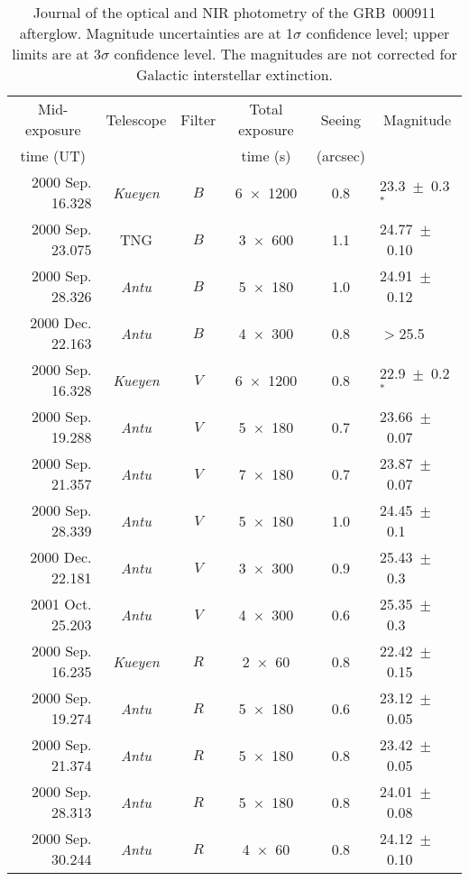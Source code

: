\begin{table}%
\caption{\label{tab1}Journal of the optical and NIR photometry of the GRB~000911 
afterglow. Magnitude uncertainties are at 1$\sigma$ confidence level; upper 
limits are at 3$\sigma$ confidence level. The magnitudes are not corrected 
for Galactic interstellar extinction.}
{
\begin{tabular}{rccccl}
\hline
\hline
\multicolumn{1}{c}{Mid-exposure} & Telescope & Filter & Total exposure &
Seeing & \multicolumn{1}{c}{Magnitude}\\
\multicolumn{1}{c}{time (UT)} & & & time (s) & (arcsec) &  \\
\hline
2000 Sep. 16.328 & {\it Kueyen} & $B$ & 6~$\times$~1200 & 0.8 &
23.3~$\pm$~0.3$^*$\\ 
2000 Sep. 23.075 & TNG          & $B$ &  3~$\times$~600 & 1.1 &
24.77~$\pm$~0.10\\ 
2000 Sep. 28.326 & {\it Antu}   & $B$ &  5~$\times$~180 & 1.0 &
24.91~$\pm$~0.12\\
2000 Dec. 22.163 & {\it Antu}   & $B$ &  4~$\times$~300 & 0.8 & 
$>$25.5\\
2000 Sep. 16.328 & {\it Kueyen} & $V$ & 6~$\times$~1200 & 0.8 &
22.9~$\pm$~0.2$^*$\\ 
2000 Sep. 19.288 & {\it Antu}   & $V$ &  5~$\times$~180 & 0.7 &
23.66~$\pm$~0.07\\
2000 Sep. 21.357 & {\it Antu}   & $V$ &  7~$\times$~180 & 0.7 &
23.87~$\pm$~0.07\\
2000 Sep. 28.339 & {\it Antu}   & $V$ &  5~$\times$~180 & 1.0 &
24.45~$\pm$~0.1\\
2000 Dec. 22.181 & {\it Antu}   & $V$ &  3~$\times$~300 & 0.9 &
25.43~$\pm$~0.3\\
2001 Oct. 25.203 & {\it Antu}   & $V$ &  4~$\times$~300 & 0.6 &
25.35~$\pm$~0.3\\
2000 Sep. 16.235 & {\it Kueyen} & $R$ &  2~$\times$~60  & 0.8 &
22.42~$\pm$~0.15\\
2000 Sep. 19.274 & {\it Antu}   & $R$ &  5~$\times$~180 & 0.6 &
23.12~$\pm$~0.05\\
2000 Sep. 21.374 & {\it Antu}   & $R$ &  5~$\times$~180 & 0.8 &
23.42~$\pm$~0.05\\
2000 Sep. 28.313 & {\it Antu}   & $R$ &  5~$\times$~180 & 0.8 &
24.01~$\pm$~0.08\\
2000 Sep. 30.244 & {\it Antu}   & $R$ &  4~$\times$~60  & 0.8 &
24.12~$\pm$~0.10\\

\end{tabular}}
\end{table}
